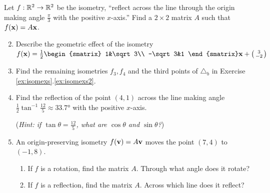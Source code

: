 \goodbreak



\begin{exercises}
	\exstart Let $f:\mathbb{R}^2\to\mathbb{R}^2$ be the isometry, ``reflect across the line through the origin making angle $\frac\pi 3$ with the positive $x$-axis.'' Find a $2\times 2$ matrix $A$ such that $f({\mathbf{x}})=A{\mathbf{x}}$.
	
	\begin{enumerate}\setcounter{enumi}{1}  
	  \item Describe the geometric effect of the isometry $f(\vx)=\frac 12
	  \begin{smatrix}
	  	1&\sqrt 3\\
	  	-\sqrt 3&1
	  \end{smatrix}
	  \vx+\stwovec 3{-2}$
	  
	  
	
	
		\item Find the remaining isometries $f_3,f_4$ and the third points of $\triangle_b$ in Exercise \ref*{ex:isomexs}.\ref{ex:isomexs2}.
		
		
		\item Find the reflection of the point $(4,1)$ across the line making angle $\frac 12\tan^{-1}\frac{12}5\approx \ang{33.7}$ with the positive $x$-axis.\par
		(\emph{Hint: if $\tan\theta=\frac{12}5$, what are $\cos\theta$ and $\sin\theta$?})
		
	  
	  \item An origin-preserving isometry $f({\mathbf{v}})=A{\mathbf{v}}$ moves the point $(7,4)$ to $(-1,8)$.
	  \begin{enumerate}
	    \item If $f$ is a rotation, find the matrix $A$. Through what angle does it rotate?
	    \item If $f$ is a reflection, find the matrix $A$. Across which line does it reflect?
	  \end{enumerate}
	  

\end{enumerate}
\end{exercises}
